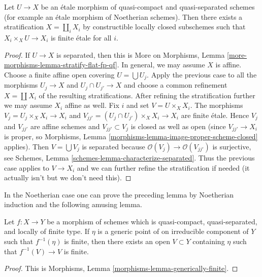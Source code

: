 \begin{lemma}
\label{lemma-etale-stratified-finite}
Let $U \to X$ be an \'etale morphism of quasi-compact and quasi-separated
schemes (for example an \'etale morphism of Noetherian schemes). Then there
exists a stratification $X = \coprod_i X_i$ by constructible locally closed
subschemes such that $X_i \times_X U \to X_i$ is finite \'etale for all $i$.
\end{lemma}

\begin{proof}
If $U \to X$ is separated, then this is
More on Morphisms, Lemma \ref{more-morphisms-lemma-stratify-flat-fp-qf}.
In general, we may assume $X$ is affine. Choose a finite affine open
covering $U = \bigcup U_j$. Apply the previous case to all the morphisms
$U_j \to X$ and $U_j \cap U_{j'} \to X$ and choose a common
refinement $X = \coprod X_i$ of the resulting stratifications.
After refining the stratification further we may assume $X_i$ affine as well.
Fix $i$ and set $V = U \times_X X_i$. The morphisms
$V_j = U_j \times_X X_i \to X_i$ and
$V_{jj'} = (U_j \cap U_{j'}) \times_X X_i \to X_i$ are finite \'etale.
Hence $V_j$ and $V_{jj'}$ are affine schemes and $V_{jj'} \subset V_j$
is closed as well as open (since $V_{jj'} \to X_i$ is proper, so
Morphisms, Lemma \ref{morphisms-lemma-image-proper-scheme-closed}
applies). Then $V = \bigcup V_j$ is separated because
$\mathcal{O}(V_j) \to \mathcal{O}(V_{jj'})$ is surjective, see
Schemes, Lemma \ref{schemes-lemma-characterize-separated}.
Thus the previous case applies to $V \to X_i$ and we can further
refine the stratification if needed (it actually isn't but we don't
need this).
\end{proof}

\noindent
In the Noetherian case one can prove the preceding lemma by
Noetherian induction and the following amusing lemma.

\begin{lemma}
\label{lemma-generically-finite}
Let $f: X \to Y$ be a morphism of schemes which is quasi-compact,
quasi-separated, and locally of finite type. If $\eta$ is a generic point
of on irreducible component of $Y$ such that $f^{-1}(\eta)$ is finite, then
there exists an open $V \subset Y$ containing $\eta$ such that
$f^{-1}(V) \to V$ is finite.
\end{lemma}

\begin{proof}
This is Morphisms, Lemma \ref{morphisms-lemma-generically-finite}.
\end{proof}

